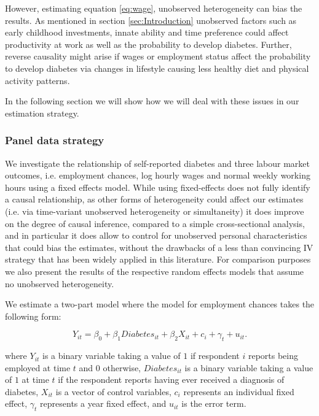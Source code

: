 \documentclass[12pt,english,british]{article}
\begin{document}
However, estimating equation  \ref{eq:wage}, unobserved heterogeneity can bias the results. As mentioned in section  \ref{sec:Introduction} unobserved factors such as early childhood investments, innate ability and time preference could affect productivity at work as well as the probability to develop diabetes. Further, reverse causality might arise if wages or employment status affect the probability to develop diabetes via changes in lifestyle causing less healthy diet and physical activity patterns.

In the following section we will show how we will deal with these issues in our estimation strategy.


\subsubsection{Panel data strategy}

We investigate the relationship of self-reported diabetes and three
labour market outcomes, i.e. employment chances, log hourly wages
and normal weekly working hours using a fixed effects model. While using fixed-effects does not fully
identify a causal relationship, as other forms of heterogeneity could
affect our estimates (i.e. via time-variant unobserved heterogeneity
or simultaneity) it does improve on the degree of causal inference,
compared to a simple cross-sectional analysis, and in particular it
does allow to control for unobserved personal characteristics that
could bias the estimates, without the drawbacks of a less than convincing
\ac{IV} strategy that has been widely applied in this literature. 
For comparison purposes we also present the results of the respective random effects models that assume no unobserved heterogeneity.

We estimate a two-part model where the model for employment chances
takes the following form:

\noindent 
\begin{equation}
Y_{it}=\beta_{0}+\beta_{1}Diabetes_{it}+\beta_{2}X_{it}+c_{i}+\gamma_{t}+u_{it}.\label{eq:employed}
\end{equation}


where $Y_{it}$ is a binary variable taking a value of $1$ if respondent
$i$ reports being employed at time $t$ and $0$ otherwise, $Diabetes_{it}$
is a binary variable taking a value of $1$ at time $t$ if the respondent
reports having ever received a diagnosis of diabetes, $X_{it}$ is
a vector of control variables, $c_{i}$ represents an individual fixed
effect, $\gamma_{t}$ represents a year fixed effect, and $u_{it}$
is the error term.
\end{document}
